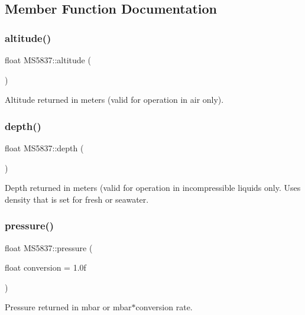 \subsection{Member Function Documentation}
\mbox{\label{classMS5837_af3c24ba068ed52a2918c784b3d608c8a}} 
\subsubsection{\texorpdfstring{altitude()}{altitude()}}
{\footnotesize\ttfamily float M\+S5837\+::altitude (\begin{DoxyParamCaption}{ }\end{DoxyParamCaption})}

Altitude returned in meters (valid for operation in air only). \mbox{\label{classMS5837_af5ec680e29a8cdaed429b9fb91d813e6}} 
\subsubsection{\texorpdfstring{depth()}{depth()}}
{\footnotesize\ttfamily float M\+S5837\+::depth (\begin{DoxyParamCaption}{ }\end{DoxyParamCaption})}

Depth returned in meters (valid for operation in incompressible liquids only. Uses density that is set for fresh or seawater. \mbox{\label{classMS5837_a14b4dd5598dc65e2d3f7c185e940af88}} 
\subsubsection{\texorpdfstring{pressure()}{pressure()}}
{\footnotesize\ttfamily float M\+S5837\+::pressure (\begin{DoxyParamCaption}\item[{float}]{conversion = {\ttfamily 1.0f} }\end{DoxyParamCaption})}

Pressure returned in mbar or mbar$\ast$conversion rate. \mbox{\label{classMS5837_a69b945b55b93c96173e8369fec1d9100}} 
